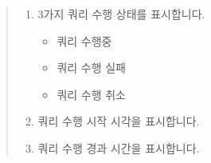 \documentclass[letterpaper,10pt,english]{sphinxmanual}
\begin{document}
\begin{quote}
\begin{enumerate}
\item {} 
 3가지 쿼리 수행 상태를 표시합니다.
\begin{itemize}
\item {} 
쿼리 수행중

\item {} 
쿼리 수행 실패

\item {} 
쿼리 수행 취소

\end{itemize}

\item {} 
 쿼리 수행 시작 시각을 표시합니다.

\item {} 
 쿼리 수행 경과 시간을 표시합니다.

\end{enumerate}
\end{quote}
\end{document}

